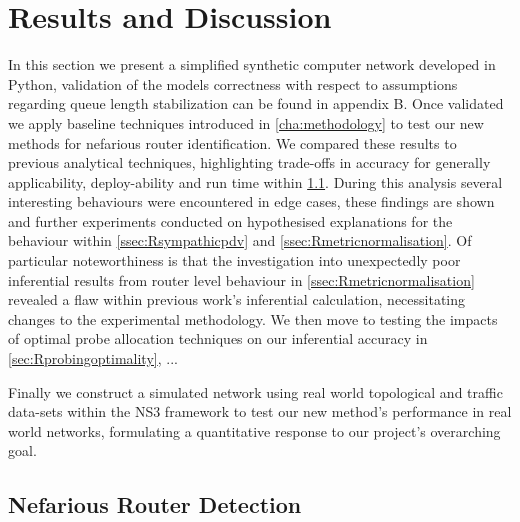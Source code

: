 \chapter{Results and Discussion}
\label{cha:result}
In this section we present a simplified synthetic computer network developed in Python, validation of the models correctness with respect to assumptions regarding queue length stabilization can be found in appendix B. Once validated we apply baseline techniques introduced in \cref{cha:methodology} to test our new methods for nefarious router identification. We compared these results to previous analytical techniques, highlighting trade-offs in accuracy for generally applicability, deploy-ability and run time within \cref{sec:Rnefarouterdetection}. During this analysis several interesting behaviours were encountered in edge cases, these findings are shown and further experiments conducted on hypothesised explanations for the behaviour within \cref{ssec:Rsympathicpdv} and \cref{ssec:Rmetricnormalisation}. Of particular noteworthiness is that the investigation into unexpectedly poor inferential results from router level \pdv  behaviour in \cref{ssec:Rmetricnormalisation} revealed a flaw within previous work's inferential calculation, necessitating changes to the experimental methodology. We then move to testing the impacts of optimal probe allocation techniques on our inferential accuracy in \cref{sec:Rprobingoptimality}, ...\par
{}
Finally we construct a simulated network using real world topological and traffic data-sets within the NS3 framework to test our new method's performance in real world networks, formulating a quantitative response to our project's overarching goal.

\section{Nefarious Router Detection}
\label{sec:Rnefarouterdetection}

